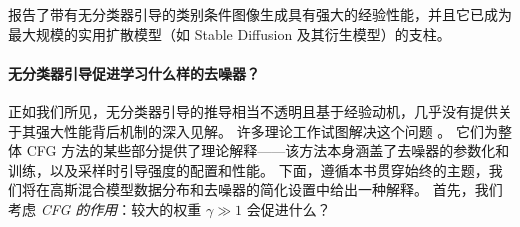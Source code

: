 \documentclass[../../book-main_zh.tex]{subfiles}
\begin{document}
\begin{algorithm}
    \caption{使用分类数据和类别条件去噪器进行条件采样。}
    \label{alg:iterative_denoising_conditional_CFG}
    \begin{algorithmic}[1]
        \EndFor
        \EndFunction
    \end{algorithmic}
\end{algorithm}

\textcite{Ho2022-ry} 报告了带有无分类器引导的类别条件图像生成具有强大的经验性能，并且它已成为最大规模的实用扩散模型（如 Stable Diffusion \cite{rombach2022high} 及其衍生模型）的支柱。

\paragraph{无分类器引导促进学习什么样的去噪器？}
正如我们所见，无分类器引导的推导相当不透明且基于经验动机，几乎没有提供关于其强大性能背后机制的深入见解。
许多理论工作试图解决这个问题 \cite{Bradley2024-jg,Li2025-li,Wu2024-js}。
它们为整体 CFG 方法的某些部分提供了理论解释——该方法本身涵盖了去噪器的参数化和训练，以及采样时引导强度的配置和性能。
下面，遵循本书贯穿始终的主题，我们将在高斯混合模型数据分布和去噪器的简化设置中给出一种解释。
首先，我们考虑 \textit{CFG 的作用}：较大的权重 $\gamma \gg 1$ 会促进什么？
\end{document}
